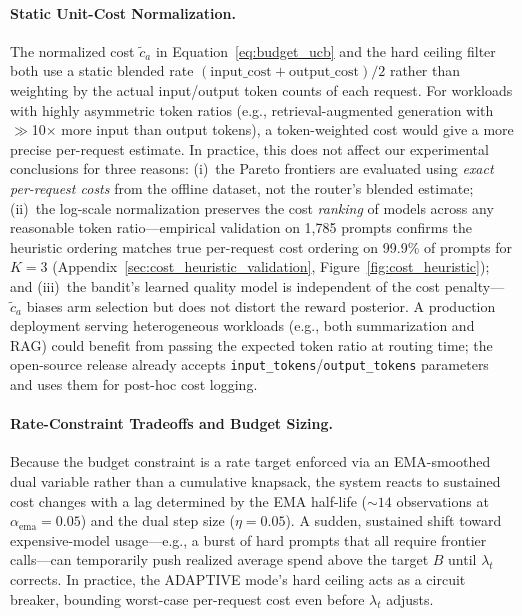 \paragraph{Static Unit-Cost Normalization.}
The normalized cost $\tilde{c}_a$ in Equation~\ref{eq:budget_ucb} and the hard ceiling filter both use a static blended rate $(\text{input\_cost} + \text{output\_cost})/2$ rather than weighting by the actual input/output token counts of each request.
For workloads with highly asymmetric token ratios (e.g., retrieval-augmented generation with $\gg$10$\times$ more input than output tokens), a token-weighted cost would give a more precise per-request estimate.
In practice, this does not affect our experimental conclusions for three reasons: (i)~the Pareto frontiers are evaluated using \emph{exact per-request costs} from the offline dataset, not the router's blended estimate; (ii)~the log-scale normalization preserves the cost \emph{ranking} of models across any reasonable token ratio---empirical validation on 1,785 prompts confirms the heuristic ordering matches true per-request cost ordering on 99.9\% of prompts for $K{=}3$ (Appendix~\ref{sec:cost_heuristic_validation}, Figure~\ref{fig:cost_heuristic}); and (iii)~the bandit's learned quality model is independent of the cost penalty---$\tilde{c}_a$ biases arm selection but does not distort the reward posterior.
A production deployment serving heterogeneous workloads (e.g., both summarization and RAG) could benefit from passing the expected token ratio at routing time; the open-source release already accepts \texttt{input\_tokens}/\texttt{output\_tokens} parameters and uses them for post-hoc cost logging.

\paragraph{Rate-Constraint Tradeoffs and Budget Sizing.}
Because the budget constraint is a rate target enforced via an EMA-smoothed dual variable rather than a cumulative knapsack, the system reacts to sustained cost changes with a lag determined by the EMA half-life (${\sim}14$ observations at $\alpha_{\mathrm{ema}}{=}0.05$) and the dual step size ($\eta{=}0.05$).
A sudden, sustained shift toward expensive-model usage---e.g., a burst of hard prompts that all require frontier calls---can temporarily push realized average spend above the target $B$ until $\lambda_t$ corrects.
In practice, the ADAPTIVE mode's hard ceiling acts as a circuit breaker, bounding worst-case per-request cost even before $\lambda_t$ adjusts.

